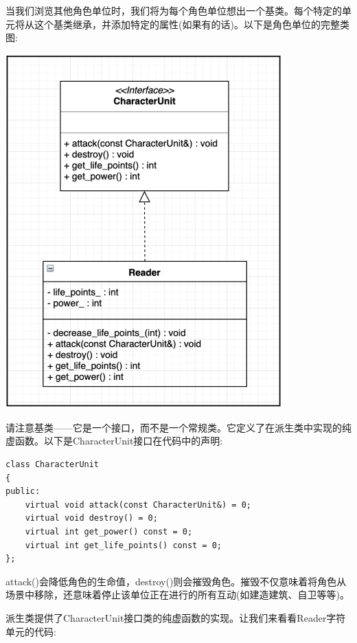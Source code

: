 当我们浏览其他角色单位时，我们将为每个角色单位想出一个基类。每个特定的单元将从这个基类继承，并添加特定的属性(如果有的话)。以下是角色单位的完整类图: \par

\begin{center}
	\includegraphics[width=0.8\textwidth]{content/Section-2/Chapter-11/5}
\end{center}

请注意基类——它是一个接口，而不是一个常规类。它定义了在派生类中实现的纯虚函数。以下是CharacterUnit接口在代码中的声明: \par

\begin{lstlisting}[caption={}]
class CharacterUnit
{
public:
	virtual void attack(const CharacterUnit&) = 0;
	virtual void destroy() = 0;
	virtual int get_power() const = 0;
	virtual int get_life_points() const = 0;
};
\end{lstlisting}

attack()会降低角色的生命值，destroy()则会摧毁角色。摧毁不仅意味着将角色从场景中移除，还意味着停止该单位正在进行的所有互动(如建造建筑、自卫等等)。 \par
派生类提供了CharacterUnit接口类的纯虚函数的实现。让我们来看看Reader字符单元的代码: \par

